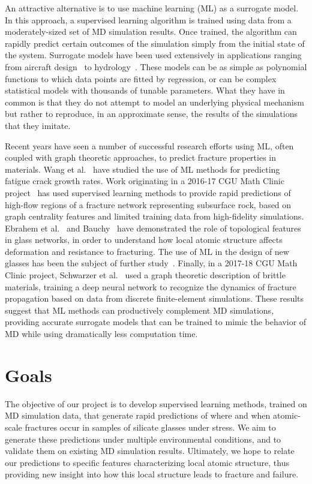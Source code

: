 An attractive alternative is to use machine learning (ML) as a surrogate model.  In this approach, a supervised learning algorithm is trained using data from a moderately-sized set of MD simulation results.  Once trained, the algorithm can rapidly predict certain outcomes of the simulation simply from the initial state of the system.  Surrogate models have been used extensively in applications ranging from aircraft design~\cite{mack2007surrogate} to hydrology~\cite{razavi2012review}.  These models can be as simple as polynomial functions to which data points are fitted by regression, or can be complex statistical models with thousands of tunable parameters.  What they have in common is that they do not attempt to model an underlying physical mechanism but rather to reproduce, in an approximate sense, the results of the simulations that they imitate.

Recent years have seen a number of successful research efforts using ML, often coupled with graph theoretic approaches, to predict fracture properties in materials. Wang et al.~\cite{MLACrack} have studied the use of ML methods for predicting fatigue crack growth rates. Work originating in a 2016-17 CGU Math Clinic project~\cite{valera2018machine,TopSystem} has used supervised learning methods to provide rapid predictions of high-flow regions of a fracture network representing subsurface rock, based on graph centrality features and limited training data from high-fidelity simulations.  Ebrahem et al.~\cite{ebrahem2018influence} and Bauchy~\cite{bauchy} have demonstrated the role of topological features in glass networks, in order to understand how local atomic structure affects deformation and resistance to fracturing.  The use of ML in the design of new glasses has been the subject of further study~\cite{liu2019machine}.  Finally, in a 2017-18 CGU Math Clinic project, Schwarzer et al.~\cite{schwarzer2019learning,mudunuru2019} used a graph theoretic description of brittle materials, training a deep neural network to recognize the dynamics of fracture propagation based on data from discrete finite-element simulations.  These results suggest that ML methods can productively complement MD simulations, providing accurate surrogate models that can be trained to mimic the behavior of MD while using dramatically less computation time.


\section{Goals}
\label{sec: Goals}
The objective of our project is to develop supervised learning methods, trained on MD simulation data, that generate rapid predictions of where and when atomic-scale fractures occur in samples of silicate glasses under stress.  We aim to generate these predictions under multiple environmental conditions, and to validate them on existing MD simulation results.  Ultimately, we hope to relate our predictions to specific features characterizing local atomic structure, thus providing new insight into how this local structure leads to fracture and failure.

